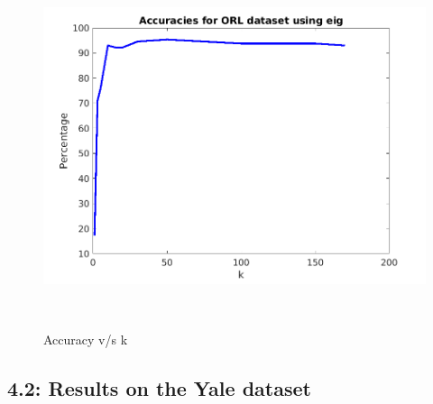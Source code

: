 \documentclass[12pt, a4paper]{article}
\begin{document}
\begin{figure}[h!]
    \centering
    \renewcommand{\thefigure}{4.1}
    \begin{minipage}[c][1\width]{0.4\textwidth}
    	\hspace*{-0.5in}
    	\includegraphics[width=1.34\textwidth]{orl_eig.png}
    	\null\vspace*{-28pt}
    	\caption{Accuracy v/s k}
	    \label{fig:4.1}
    \end{minipage} \\
\end{figure}

\newpage
\subsection*{4.2: Results on the Yale dataset}
\end{document}
